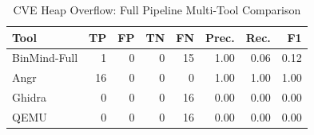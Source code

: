 \begin{table}[htbp]
\centering
\caption{CVE Heap Overflow: Full Pipeline Multi-Tool Comparison}
\label{tab:cve-full-comparison}
\begin{tabular}{lrrrrrrr}
\toprule
Tool & TP & FP & TN & FN & Prec. & Rec. & F1 \\
\midrule
BinMind-Full & 1 & 0 & 0 & 15 & 1.00 & 0.06 & 0.12 \\
Angr & 16 & 0 & 0 & 0 & 1.00 & 1.00 & 1.00 \\
Ghidra & 0 & 0 & 0 & 16 & 0.00 & 0.00 & 0.00 \\
QEMU & 0 & 0 & 0 & 16 & 0.00 & 0.00 & 0.00 \\
\bottomrule
\end{tabular}
\end{table}
